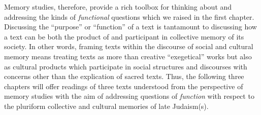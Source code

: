 Memory studies, therefore, provide a rich toolbox for thinking about and addressing the kinds of \emph{functional} questions which we raised in the first chapter. Discussing the ``purpose'' or ``function'' of a text is tantamount to discussing how a text can be both the product of and participant in collective memory of its society. In other words, framing \rwb texts within the discourse of social and cultural memory means treating \rwb texts as more than creative ``exegetical'' works but also as cultural products which participate in social structures and discourses with concerns other than the explication of sacred texts. Thus, the following three chapters will offer readings of three \rwb texts understood from the perspective of memory studies with the aim of addressing questions of \emph{function} with respect to the pluriform collective and cultural memories of late \secondtemple Judaism(s).